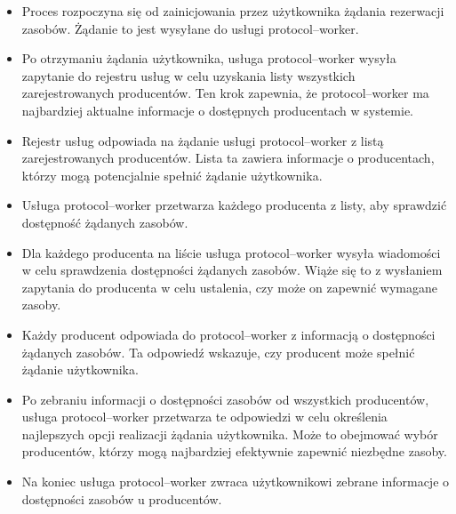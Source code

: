 \begin{itemize}
    \item Proces rozpoczyna się od zainicjowania przez użytkownika żądania rezerwacji zasobów. Żądanie to jest wysyłane do usługi  protocol--worker.
    \item Po otrzymaniu żądania użytkownika, usługa protocol--worker wysyła zapytanie do rejestru usług w celu uzyskania listy wszystkich zarejestrowanych producentów. Ten krok zapewnia, że protocol--worker ma najbardziej aktualne informacje o dostępnych producentach w systemie.
    \item Rejestr usług odpowiada na żądanie usługi protocol--worker z listą zarejestrowanych producentów. Lista ta zawiera informacje o producentach, którzy mogą potencjalnie spełnić żądanie użytkownika.
    \item Usługa protocol--worker przetwarza każdego producenta z listy, aby sprawdzić dostępność żądanych zasobów.
    \item Dla każdego producenta na liście usługa protocol--worker wysyła wiadomości w celu sprawdzenia dostępności żądanych zasobów. Wiąże się to z wysłaniem zapytania do producenta w celu ustalenia, czy może on zapewnić wymagane zasoby.
    \item Każdy producent odpowiada do protocol--worker z informacją o dostępności żądanych zasobów. Ta odpowiedź wskazuje, czy producent może spełnić żądanie użytkownika.
    \item Po zebraniu informacji o dostępności zasobów od wszystkich producentów, usługa protocol--worker przetwarza te odpowiedzi w celu określenia najlepszych opcji realizacji żądania użytkownika. Może to obejmować wybór producentów, którzy mogą najbardziej efektywnie zapewnić niezbędne zasoby.
    \item Na koniec usługa protocol--worker zwraca użytkownikowi zebrane informacje o dostępności zasobów u producentów.
\end{itemize}

